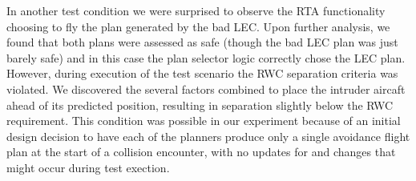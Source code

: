In another test condition we were surprised to observe the RTA functionality choosing to fly the plan generated by the bad LEC.  Upon further analysis, we found that both plans were assessed as safe (though the bad LEC plan was just barely safe) and in this case the plan selector logic correctly chose the LEC plan.  However, during execution of the test scenario the RWC separation criteria was violated.  We discovered the several factors combined to place the intruder aircaft ahead of its predicted position, resulting in separation slightly below the RWC requirement.  This condition was possible in our experiment because of an initial design decision to have each of the planners produce only a single avoidance flight plan at the start of a collision encounter, with no updates for and changes that might occur during test exection.  


